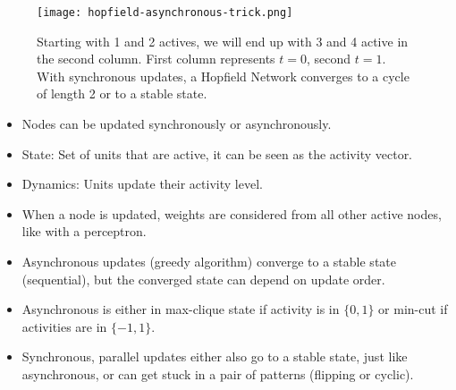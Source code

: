 \documentclass[main]{subfiles}
\begin{document}
\begin{figure}[H]
	\centering
	\texttt{[image: hopfield-asynchronous-trick.png]}
	\caption{Starting with 1 and 2 actives, we will end up with 3 and 4 active in the second column. First column represents $t=0$, second $t=1$. With synchronous updates, a Hopfield Network converges to a cycle of length 2 or to a stable state.}
\end{figure}

\begin{itemize}[noitemsep,nolistsep]
	\item Nodes can be updated synchronously or asynchronously.
	\item State: Set of units that are active, it can be seen as the activity vector.
	\item Dynamics: Units update their activity level.
	\item When a node is updated, weights are considered from all other active nodes, like with a perceptron.
	\item Asynchronous updates (greedy algorithm) converge to a stable state (sequential), but the converged state can depend on update order.
	\item Asynchronous is either in max-clique state if activity is in $\{0,1\}$ or min-cut if activities are in $\{-1,1\}$.
	\item Synchronous, parallel updates either also go to a stable state, just like asynchronous, or can get stuck in a pair of patterns (flipping or cyclic).
\end{itemize}
\end{document}
